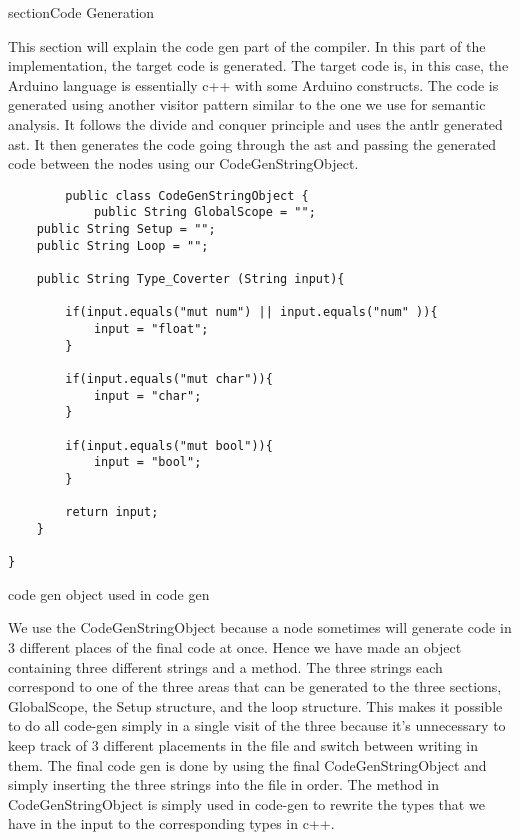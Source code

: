 section{Code Generation}

This section will explain the code gen part of the compiler. In this part of the implementation, the target
code is generated. The target code is, in this case, the Arduino language is essentially c++ with some Arduino constructs. The code is generated using another visitor pattern similar to the one we use for semantic analysis. It follows the divide and conquer principle and uses the antlr generated ast. It then generates the code going through the ast and passing the generated code between the nodes using our CodeGenStringObject.

\begin{listing}[htb!]
    \begin{verbatim}
        public class CodeGenStringObject {
            public String GlobalScope = "";
    public String Setup = "";
    public String Loop = "";

    public String Type_Coverter (String input){
        
        if(input.equals("mut num") || input.equals("num" )){
            input = "float";
        }
        
        if(input.equals("mut char")){
            input = "char";
        }

        if(input.equals("mut bool")){
            input = "bool";
        }
        
        return input;
    }
    
}
\end{verbatim}
\caption{code gen object used in code gen}
\label{lst:code gen object}
\end{listing}

We use the CodeGenStringObject because a node sometimes will generate code in 3 different places of the final code at once. Hence we have made an object containing three different strings and a method. The three strings each correspond to one of the three areas that can be generated to the three sections, GlobalScope, the Setup structure, and the loop structure. This makes it possible to do all code-gen simply in a single visit of the three because it's unnecessary to keep track of 3 different placements in the file and switch between writing in them. The final code gen is done by using the final CodeGenStringObject and simply inserting the three strings into the file in order.  The method in CodeGenStringObject is simply used in code-gen to rewrite the types that we have in the input to the corresponding types in c++.


